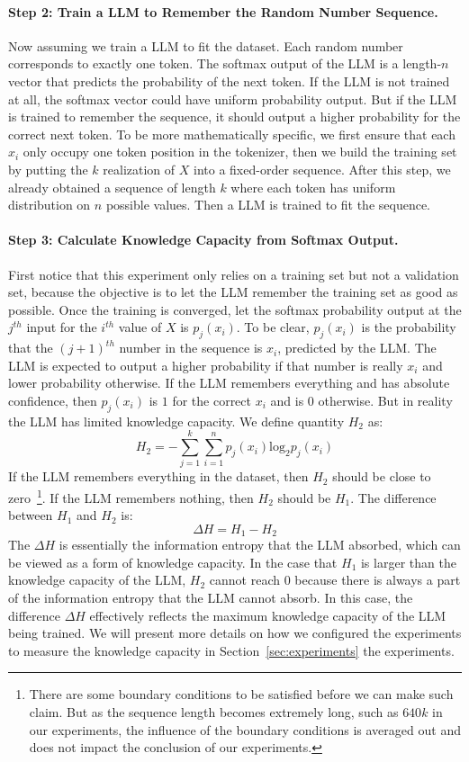 \documentclass{article} %
\begin{document}
\paragraph{Step 2: Train a LLM to Remember the Random Number Sequence.} Now assuming we train a LLM to fit the dataset. Each random number corresponds to exactly one token. The softmax output of the LLM is a length-$n$ vector that predicts the probability of the next token. If the LLM is not trained at all, the softmax vector could have uniform probability output. But if the LLM is trained to remember the sequence, it should output a higher probability for the correct next token. To be more mathematically specific, we first ensure that each $x_i$ only occupy one token position in the tokenizer, then we build the training set by putting the $k$ realization of $X$ into a fixed-order sequence. After this step, we already obtained a sequence of length $k$ where each token has uniform distribution on $n$ possible values. Then a LLM is trained to fit the sequence. 
\paragraph{Step 3: Calculate Knowledge Capacity from Softmax Output.} First notice that this experiment only relies on a training set but not a validation set, because the objective is to let the LLM remember the training set as good as possible. Once the training is converged, let the softmax probability output at the $j^{th}$ input for the $i^{th}$ value of $X$ is $p_j(x_i)$. To be clear, $p_j(x_i)$ is the probability that the $(j+1)^{th}$ number in the sequence is $x_i$, predicted by the LLM. The LLM is expected to output a higher probability if that number is really $x_i$ and lower probability otherwise. If the LLM remembers everything and has absolute confidence, then $p_j(x_i)$ is $1$ for the correct $x_i$ and is $0$ otherwise. But in reality the LLM has limited knowledge capacity. We define quantity $H_2$ as:
\[
H_2 = -\sum_{j=1}^k\sum_{i=1}^n p_j(x_i) \mathrm{log_2}p_j(x_i)
\]
If the LLM remembers everything in the dataset, then $H_2$ should be close to zero~\footnote{There are some boundary conditions to be satisfied before we can make such claim. But as the sequence length becomes extremely long, such as $640k$ in our experiments, the influence of the boundary conditions is averaged out and does not impact the conclusion of our experiments.}. If the LLM remembers nothing, then $H_2$ should be $H_1$. The difference between $H_1$ and $H_2$ is:
\[
\Delta H = H_1-H_2
\]
The $\Delta H$ is essentially the information entropy that the LLM absorbed, which can be viewed as a form of knowledge capacity. In the case that $H_1$ is larger than the knowledge capacity of the LLM, $H_2$ cannot reach 0 because there is always a part of the information entropy that the LLM cannot absorb. In this case, the difference $\Delta H$ effectively reflects the maximum knowledge capacity of the LLM being trained. We will present more details on how we configured the experiments to measure the knowledge capacity in Section~\ref{sec:experiments} the experiments.
\end{document}
